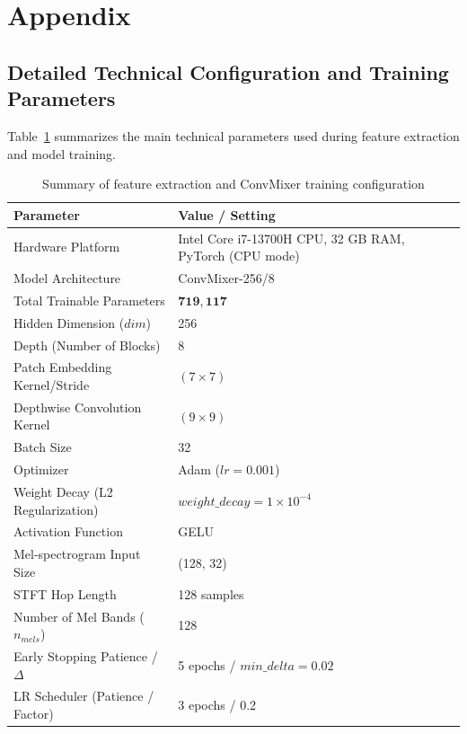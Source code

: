 \section*{Appendix}

\subsection*{Detailed Technical Configuration and Training Parameters}

Table~\ref{tab:config} summarizes the main technical parameters used during feature extraction and model training.

\begin{table}[htbp]
\centering
\caption{\label{tab:config}Summary of feature extraction and ConvMixer training configuration}
\begin{tabular}{|l|l|}
\hline
\textbf{Parameter} & \textbf{Value / Setting} \\
\hline
Hardware Platform & Intel Core i7-13700H CPU, 32 GB RAM, PyTorch (CPU mode) \\
\hline
Model Architecture & ConvMixer-256/8 \\
\hline
Total Trainable Parameters & $\mathbf{719,117}$ \\
\hline
Hidden Dimension ($dim$) & 256 \\
\hline
Depth (Number of Blocks) & 8 \\
\hline
Patch Embedding Kernel/Stride & $(7 \times 7)$ \\
\hline
Depthwise Convolution Kernel & $(9 \times 9)$ \\
\hline
Batch Size & 32 \\
\hline
Optimizer & Adam ($lr = 0.001$) \\
\hline
Weight Decay (L2 Regularization) & $weight\_decay = 1\times10^{-4}$ \\
\hline
Activation Function & GELU \\
\hline
Mel-spectrogram Input Size & (128, 32) \\
\hline
STFT Hop Length & 128 samples \\
\hline
Number of Mel Bands ($n_{mels}$) & 128 \\
\hline
Early Stopping Patience / $\Delta$ & 5 epochs / $min\_delta = 0.02$ \\
\hline
LR Scheduler (Patience / Factor) & 3 epochs / 0.2 \\
\hline
\end{tabular}
\end{table}